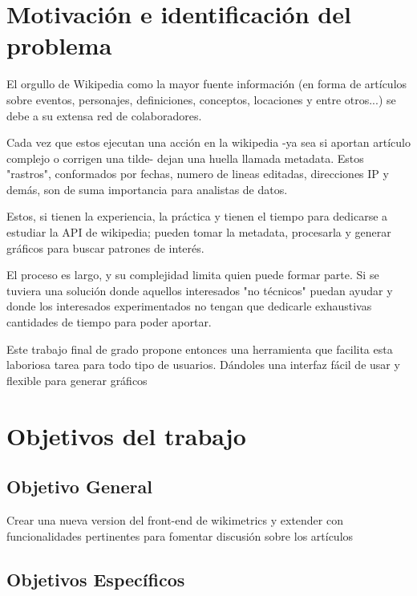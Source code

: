 

\section{Motivación e identificación del problema}

El orgullo de Wikipedia como la mayor fuente información (en forma de artículos sobre eventos, personajes, definiciones, conceptos, locaciones y entre otros...) se debe a su extensa red de colaboradores.

Cada vez que estos ejecutan una acción en la wikipedia -ya sea si aportan artículo complejo o corrigen una tilde- dejan una huella llamada metadata. Estos "rastros", conformados por fechas, numero de lineas editadas, direcciones IP y demás, son de suma importancia para analistas de datos.

Estos, si tienen la experiencia, la práctica y tienen el tiempo para dedicarse a estudiar la API de wikipedia; pueden tomar la metadata, procesarla y generar gráficos para buscar patrones de interés. 

El proceso es largo, y su complejidad limita quien puede formar parte. Si se tuviera una solución donde aquellos interesados "no técnicos" puedan ayudar y donde los interesados experimentados no tengan que dedicarle exhaustivas cantidades de tiempo para poder aportar.

Este trabajo final de grado propone entonces una herramienta que facilita esta laboriosa tarea para todo tipo de usuarios. 
Dándoles una interfaz fácil de usar y flexible para generar gráficos 


\section{Objetivos del trabajo}


\subsection{Objetivo General}
Crear una nueva version del front-end de wikimetrics y extender con funcionalidades pertinentes para fomentar discusión sobre los artículos

\subsection{Objetivos Específicos}

